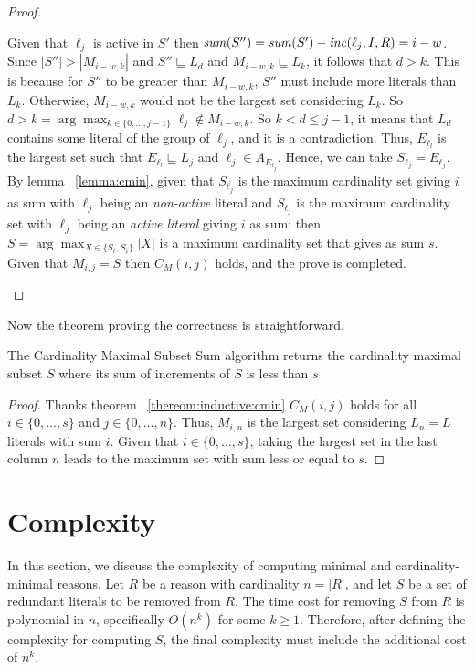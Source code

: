 \begin{proof}
\begin{itemize}
\begin{itemize}
            Given that $\ell_j$ is active in $S'$ then $\mathit{sum}(S'') = \mathit{sum}(S') - \mathit{inc}(\ell_j,I,R) = i - w$.
            Since $|S''| > |M_{i-w,k}|$ and $S'' \sqsubseteq L_d$ and $M_{i-w,k} \sqsubseteq L_k$, it follows that $d > k$. This is because for $S''$ to be greater than $M_{i-w,k}$, $S''$ must include more literals than $L_k$. Otherwise, $M_{i-w,k}$ would not be the largest set considering $L_k$.
            So $d > k = \arg \max_{k \in \{0,\hdots,j-1\}} \ell_j \not\in M_{i-w,k}$.
            So $k < d \le j-1$, it means that $L_d$ contains some literal of the group of $\ell_j$,
            and it is a contradiction.
            Thus, $E_{\ell_l}$ is the largest set such that $E_{\ell_l} \sqsubseteq L_j$ and $\ell_j \in A_{E_{\ell_j}}$.
            Hence, we can take $S_{\ell_j} = E_{\ell_j}$.
            By lemma ~\ref{lemma:cmin}, given that $S_{\overline{\ell_j}}$ is the maximum cardinality set giving $i$ as sum with $\ell_j$ 
            being an \textit{non-active} literal
            and $S_{\ell_j}$ is the maximum cardinality set with $\ell_j$ being an \textit{active literal} giving $i$  as sum;
            then $S = \arg\max_{X \in \{S_{\ell}, S_{\overline{\ell}}\}} |X|$  is a maximum cardinality set that gives as sum $s$.
            Given that $M_{i,j} = S$ then $C_M(i,j)$ holds, and the prove is completed.
    \end{itemize}
   \end{itemize}
\end{proof}

Now the theorem proving the correctness is straightforward.
\begin{theorem}
    \label{theorem:cardinality:maximal}
    The Cardinality Maximal Subset Sum algorithm returns the cardinality maximal subset $S$ where its sum 
    of increments of $S$ is less than $s$
\end{theorem}

\begin{proof}
    Thanks theorem ~\ref{thereom:inductive:cmin} $C_M(i,j)$ holds for all $i \in \{0, \hdots, s\}$
    and $j \in \{0, \hdots, n\}$.
    Thus, $M_{i,n}$ is the largest set considering $L_n = L$ literals with sum $i$.
    Given that $i \in \{0, \hdots, s\}$, taking the largest set in the last column $n$ leads to the maximum set with sum less or equal 
    to $s$.
\end{proof}

\section{Complexity}
\label{sec:complexity}
In this section, we discuss the complexity of computing minimal and cardinality-minimal reasons. 
Let $R$ be a reason with cardinality $n = |R|$, and let $S$ be a set of redundant literals to be removed from $R$. 
The time cost for removing $S$ from $R$ is polynomial in $n$, specifically $O(n^k)$ for some $k \ge 1$. 
Therefore, after defining the complexity for computing $S$, the final complexity must include the additional cost of $n^k$.

